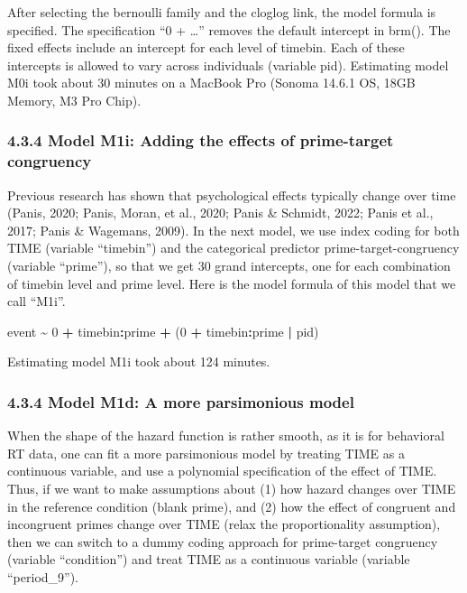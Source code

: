 \documentclass[
  man, donotrepeattitle,floatsintext]{apa6}
\newenvironment{Shaded}{\begin{snugshade}}{\end{snugshade}}
\newcommand{\DecValTok}[1]{\textcolor[rgb]{0.00,0.00,0.81}{#1}}
\newcommand{\NormalTok}[1]{#1}
\newcommand{\SpecialCharTok}[1]{\textcolor[rgb]{0.81,0.36,0.00}{\textbf{#1}}}
\begin{document}
After selecting the bernoulli family and the cloglog link, the model formula is specified. The specification ``0 + \ldots{}'' removes the default intercept in brm(). The fixed effects include an intercept for each level of timebin. Each of these intercepts is allowed to vary across individuals (variable pid). Estimating model M0i took about 30 minutes on a MacBook Pro (Sonoma 14.6.1 OS, 18GB Memory, M3 Pro Chip).

\subsubsection{4.3.4 Model M1i: Adding the effects of prime-target congruency}\label{model-m1i-adding-the-effects-of-prime-target-congruency}

Previous research has shown that psychological effects typically change over time (Panis, 2020; Panis, Moran, et al., 2020; Panis \& Schmidt, 2022; Panis et al., 2017; Panis \& Wagemans, 2009). In the next model, we use index coding for both TIME (variable ``timebin'') and the categorical predictor prime-target-congruency (variable ``prime''), so that we get 30 grand intercepts, one for each combination of timebin level and prime level. Here is the model formula of this model that we call ``M1i''.

\begin{Shaded}
\begin{Highlighting}[]
\NormalTok{event }\SpecialCharTok{\textasciitilde{}} \DecValTok{0} \SpecialCharTok{+}\NormalTok{ timebin}\SpecialCharTok{:}\NormalTok{prime }\SpecialCharTok{+}\NormalTok{ (}\DecValTok{0} \SpecialCharTok{+}\NormalTok{ timebin}\SpecialCharTok{:}\NormalTok{prime }\SpecialCharTok{|}\NormalTok{ pid)}
\end{Highlighting}
\end{Shaded}

Estimating model M1i took about 124 minutes.

\subsubsection{4.3.4 Model M1d: A more parsimonious model}\label{model-m1d-a-more-parsimonious-model}

When the shape of the hazard function is rather smooth, as it is for behavioral RT data, one can fit a more parsimonious model by treating TIME as a continuous variable, and use a polynomial specification of the effect of TIME. Thus, if we want to make assumptions about (1) how hazard changes over TIME in the reference condition (blank prime), and (2) how the effect of congruent and incongruent primes change over TIME (relax the proportionality assumption), then we can switch to a dummy coding approach for prime-target congruency (variable ``condition'') and treat TIME as a continuous variable (variable ``period\_9'').
\end{document}
